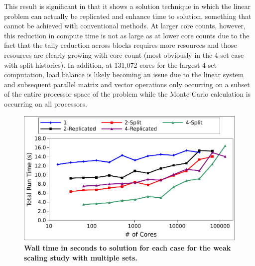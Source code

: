 This result is significant in that it shows a solution technique in
which the linear problem can actually be replicated and enhance time
to solution, something that cannot be achieved with conventional
methods. At larger core counts, however, this reduction in compute
time is not as large as at lower core counts due to the fact that the
tally reduction across blocks requires more resources and those
resources are clearly growing with core count (most obviously in the 4
set case with split histories). In addition, at 131,072 cores for the
largest 4 set computation, load balance is likely becoming an issue
due to the linear system and subsequent parallel matrix and vector
operations only occurring on a subset of the entire processor space of
the problem while the Monte Carlo calculation is occurring on all
processors.

\begin{figure}[t!]
  \begin{center}
    \includegraphics[width=6in]{chapters/parallel_mc/titan_weak_ms_time.pdf}
  \end{center}
  \caption{\textbf{Wall time in seconds to solution for each case for
      the weak scaling study with multiple sets.}}
  \label{fig:titan_weak_ms_time}
\end{figure}

